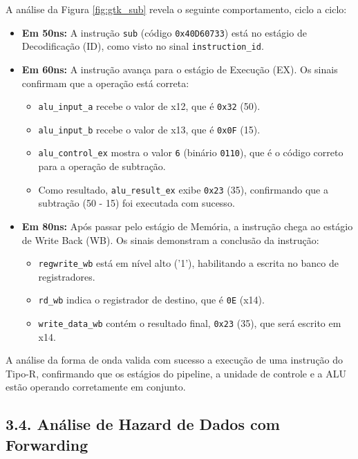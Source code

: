 \documentclass[12pt, a4paper]{article}
\begin{document}
A análise da Figura \ref{fig:gtk_sub} revela o seguinte comportamento, ciclo a ciclo:
\begin{itemize}
    \item \textbf{Em 50ns:} A instrução \texttt{sub} (código \texttt{0x40D60733}) está no estágio de Decodificação (ID), como visto no sinal \texttt{instruction\_id}.
    
    \item \textbf{Em 60ns:} A instrução avança para o estágio de Execução (EX). Os sinais confirmam que a operação está correta:
    \begin{itemize}
        \item \texttt{alu\_input\_a} recebe o valor de x12, que é \texttt{0x32} (50).
        \item \texttt{alu\_input\_b} recebe o valor de x13, que é \texttt{0x0F} (15).
        \item \texttt{alu\_control\_ex} mostra o valor \texttt{6} (binário \texttt{0110}), que é o código correto para a operação de subtração.
        \item Como resultado, \texttt{alu\_result\_ex} exibe \texttt{0x23} (35), confirmando que a subtração (50 - 15) foi executada com sucesso.
    \end{itemize}
    
    \item \textbf{Em 80ns:} Após passar pelo estágio de Memória, a instrução chega ao estágio de Write Back (WB). Os sinais demonstram a conclusão da instrução:
    \begin{itemize}
        \item \texttt{regwrite\_wb} está em nível alto ('1'), habilitando a escrita no banco de registradores.
        \item \texttt{rd\_wb} indica o registrador de destino, que é \texttt{0E} (x14).
        \item \texttt{write\_data\_wb} contém o resultado final, \texttt{0x23} (35), que será escrito em x14.
    \end{itemize}
\end{itemize}

A análise da forma de onda valida com sucesso a execução de uma instrução do Tipo-R, confirmando que os estágios do pipeline, a unidade de controle e a ALU estão operando corretamente em conjunto.

\subsection*{3.4. Análise de Hazard de Dados com Forwarding}
\end{document}
